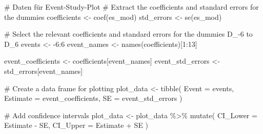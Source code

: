 \documentclass[
  a4paper,
  DIV=11,
  oneside]{scrreprt}
\newenvironment{Shaded}{\begin{snugshade}}{\end{snugshade}}
\newcommand{\AttributeTok}[1]{\textcolor[rgb]{0.40,0.45,0.13}{#1}}
\newcommand{\CommentTok}[1]{\textcolor[rgb]{0.37,0.37,0.37}{#1}}
\newcommand{\DecValTok}[1]{\textcolor[rgb]{0.68,0.00,0.00}{#1}}
\newcommand{\FunctionTok}[1]{\textcolor[rgb]{0.28,0.35,0.67}{#1}}
\newcommand{\NormalTok}[1]{\textcolor[rgb]{0.00,0.23,0.31}{#1}}
\newcommand{\OtherTok}[1]{\textcolor[rgb]{0.00,0.23,0.31}{#1}}
\newcommand{\SpecialCharTok}[1]{\textcolor[rgb]{0.37,0.37,0.37}{#1}}
\begin{document}
\begin{Shaded}
\begin{Highlighting}[]
\CommentTok{\# Daten für Event{-}Study{-}Plot}
\CommentTok{\# Extract the coefficients and standard errors for the dummies}
\NormalTok{coefficients }\OtherTok{\textless{}{-}} \FunctionTok{coef}\NormalTok{(es\_mod)}
\NormalTok{std\_errors }\OtherTok{\textless{}{-}} \FunctionTok{se}\NormalTok{(es\_mod)}

\CommentTok{\# Select the relevant coefficients and standard errors for the dummies D\_{-}6 to D\_6}
\NormalTok{events }\OtherTok{\textless{}{-}} \SpecialCharTok{{-}}\DecValTok{6}\SpecialCharTok{:}\DecValTok{6}
\NormalTok{event\_names }\OtherTok{\textless{}{-}} \FunctionTok{names}\NormalTok{(coefficients)[}\DecValTok{1}\SpecialCharTok{:}\DecValTok{13}\NormalTok{]}

\NormalTok{event\_coefficients }\OtherTok{\textless{}{-}}\NormalTok{ coefficients[event\_names]}
\NormalTok{event\_std\_errors }\OtherTok{\textless{}{-}}\NormalTok{ std\_errors[event\_names]}


\CommentTok{\# Create a data frame for plotting}
\NormalTok{plot\_data }\OtherTok{\textless{}{-}} \FunctionTok{tibble}\NormalTok{(}
  \AttributeTok{Event =}\NormalTok{ events,}
  \AttributeTok{Estimate =}\NormalTok{ event\_coefficients,}
  \AttributeTok{SE =}\NormalTok{ event\_std\_errors}
\NormalTok{)}

\CommentTok{\# Add confidence intervals}
\NormalTok{plot\_data }\OtherTok{\textless{}{-}}\NormalTok{ plot\_data }\SpecialCharTok{\%\textgreater{}\%}
  \FunctionTok{mutate}\NormalTok{(}
    \AttributeTok{CI\_Lower =}\NormalTok{ Estimate }\SpecialCharTok{{-}}\NormalTok{ SE,}
    \AttributeTok{CI\_Upper =}\NormalTok{ Estimate }\SpecialCharTok{+}\NormalTok{ SE}
\NormalTok{  )}
\end{Highlighting}
\end{Shaded}
\end{document}
